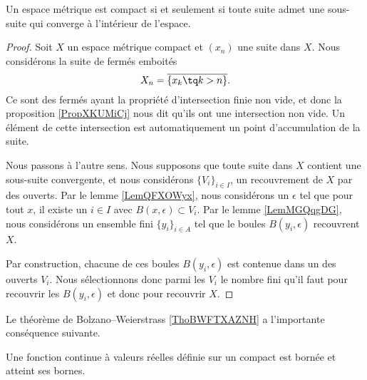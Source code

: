 \begin{theorem}\label{ThoBWFTXAZNH}
    Un espace métrique est compact si et seulement si toute suite admet une sous-suite qui converge à l'intérieur de l'espace.
\end{theorem}

\begin{proof}
   Soit \( X\) un espace métrique compact et \( (x_n)\) une suite dans \( X\). Nous considérons la suite de fermés emboités
   \begin{equation}
       X_n=\overline{ \{ x_k\tq k>n \} }.
   \end{equation}
   Ce sont des fermés ayant la propriété d'intersection finie non vide, et donc la proposition \ref{PropXKUMiCj} nous dit qu'ils ont une intersection non vide. Un élément de cette intersection est automatiquement un point d'accumulation de la suite.

   Nous passons à l'autre sens. Nous supposons que toute suite dans \( X\) contient une sous-suite convergente, et nous considérons \( \{ V_i \}_{i\in I}\), un recouvrement de \( X\) par des ouverts. Par le lemme \ref{LemQFXOWyx}, nous considérons un \( \epsilon\) tel que pour tout \( x\), il existe un \( i\in I\) avec \( B(x,\epsilon)\subset V_i\). Par le lemme \ref{LemMGQqgDG}, nous considérons un ensemble fini \( \{ y_i \}_{i\in A}\) tel que le boules \( B(y_i,\epsilon)\) recouvrent \( X\).

   Par construction, chacune de ces boules \( B(y_i,\epsilon)\) est contenue dans un des ouverts \( V_i\). Nous sélectionnons donc parmi les \( V_i\) le nombre fini qu'il faut pour recouvrir les \( B(y_i,\epsilon)\) et donc pour recouvrir \( X\).
\end{proof}

Le théorème de Bolzano–Weierstrass \ref{ThoBWFTXAZNH} a l'importante conséquence suivante.
\begin{theorem}[Weierstrass]		\label{ThoWeirstrassRn}
	Une fonction continue à valeurs réelles définie sur un compact est bornée et atteint ses bornes.
\end{theorem}


